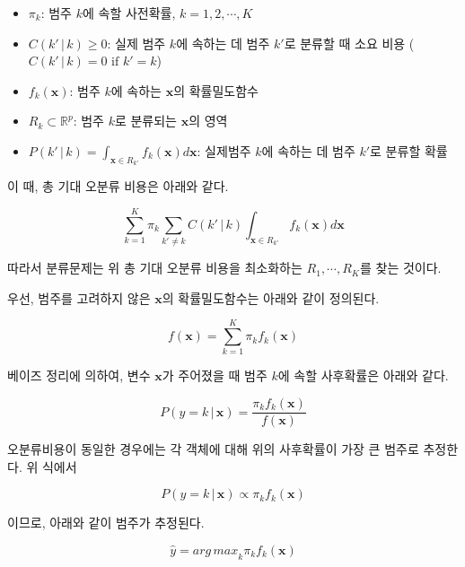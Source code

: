 \documentclass[]{book}
\providecommand{\tightlist}{%
  \setlength{\itemsep}{0pt}\setlength{\parskip}{0pt}}
\begin{document}
\begin{itemize}
\tightlist
\item
  \(\pi_k\): 범주 \(k\)에 속할 사전확률, \(k = 1, 2, \cdots, K\)
\item
  \(C(k' \, | \, k) \ge 0\): 실제 범주 \(k\)에 속하는 데 범주 \(k'\)로 분류할 때 소요 비용 (\(C(k' \, | \, k) = 0 \text{ if } k' = k\))
\item
  \(f_k(\mathbf{x})\): 범주 \(k\)에 속하는 \(\mathbf{x}\)의 확률밀도함수
\item
  \(R_k \subset \mathbb{R}^p\): 범주 \(k\)로 분류되는 \(\mathbf{x}\)의 영역
\item
  \(P(k' \, | \, k) = \int_{\mathbf{x} \in R_{k'}} f_k(\mathbf{x}) d\mathbf{x}\): 실제범주 \(k\)에 속하는 데 범주 \(k'\)로 분류할 확률
\end{itemize}

이 때, 총 기대 오분류 비용은 아래와 같다.

\begin{equation*}
\sum_{k = 1}^{K} \pi_k \sum_{k' \neq k} C(k' \, | \, k) \int_{\mathbf{x} \in R_{k'}} f_k(\mathbf{x}) d\mathbf{x}
\end{equation*}

따라서 분류문제는 위 총 기대 오분류 비용을 최소화하는 \(R_1, \cdots, R_K\)를 찾는 것이다.

우선, 범주를 고려하지 않은 \(\mathbf{x}\)의 확률밀도함수는 아래와 같이 정의된다.

\begin{equation*}
f(\mathbf{x}) = \sum_{k=1}^{K} \pi_k f_k(\mathbf{x})
\end{equation*}

베이즈 정리에 의하여, 변수 \(\mathbf{x}\)가 주어졌을 때 범주 \(k\)에 속할 사후확률은 아래와 같다.

\begin{equation*}
P(y = k \,|\, \mathbf{x}) = \frac{\pi_k f_k(\mathbf{x})}{f(\mathbf{x})}
\end{equation*}

오분류비용이 동일한 경우에는 각 객체에 대해 위의 사후확률이 가장 큰 범주로 추정한다. 위 식에서

\begin{equation*}
P(y = k \,|\, \mathbf{x}) \propto \pi_k f_k(\mathbf{x})
\end{equation*}

이므로, 아래와 같이 범주가 추정된다.

\begin{equation*}
\hat{y} = {arg\,max}_{k} \pi_k f_k(\mathbf{x})
\end{equation*}
\end{document}
